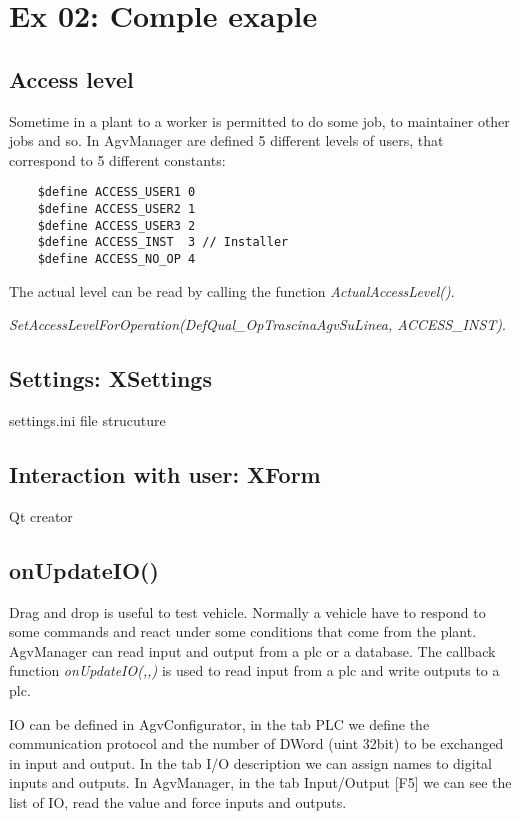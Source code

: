 \section{Ex 02: Comple exaple}%

\subsection{Access level}
Sometime in a plant to a worker is permitted to do some job, to maintainer other jobs and so. In AgvManager are defined 5 different levels of users, that correspond to 5 different constants:

\begin{lstlisting}
	$define ACCESS_USER1 0
	$define ACCESS_USER2 1
	$define ACCESS_USER3 2
	$define ACCESS_INST  3 // Installer
	$define ACCESS_NO_OP 4
\end{lstlisting}

The actual level can be read by calling the function \textit{ActualAccessLevel()}.

\textit{SetAccessLevelForOperation(DefQual\_OpTrascinaAgvSuLinea, ACCESS\_INST)}.

\subsection{Settings: XSettings}

settings.ini file strucuture

\subsection{Interaction with user: XForm}
Qt creator

\subsection{onUpdateIO()}
Drag and drop is useful to test vehicle. Normally a vehicle have to respond to some commands and react under some conditions that come from the plant. AgvManager can read input and output from a plc or a database. The callback function \textit{onUpdateIO(,,)} is used to read input from a plc and write outputs to a plc.

IO can be defined in AgvConfigurator, in the tab PLC we define the communication protocol and the number of DWord (uint 32bit) to be exchanged in input and output. In the tab I/O description we can assign names to digital inputs and outputs.
In AgvManager, in the tab Input/Output [F5] we can see the list of IO, read the value and force inputs and outputs.

